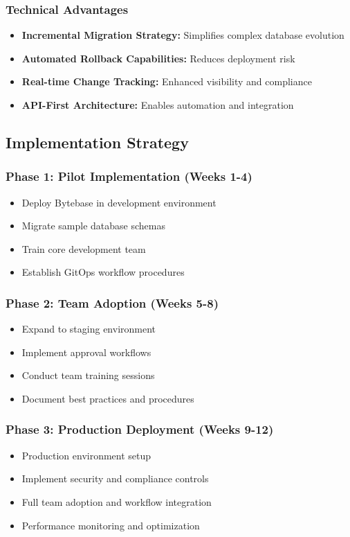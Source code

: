 \subsubsection{Technical Advantages}
\begin{itemize}
    \item \textbf{Incremental Migration Strategy:} Simplifies complex database evolution
    \item \textbf{Automated Rollback Capabilities:} Reduces deployment risk
    \item \textbf{Real-time Change Tracking:} Enhanced visibility and compliance
    \item \textbf{API-First Architecture:} Enables automation and integration
\end{itemize}

\subsection{Implementation Strategy}

\subsubsection{Phase 1: Pilot Implementation (Weeks 1-4)}
\begin{itemize}
    \item Deploy Bytebase in development environment
    \item Migrate sample database schemas
    \item Train core development team
    \item Establish GitOps workflow procedures
\end{itemize}

\subsubsection{Phase 2: Team Adoption (Weeks 5-8)}
\begin{itemize}
    \item Expand to staging environment
    \item Implement approval workflows
    \item Conduct team training sessions
    \item Document best practices and procedures
\end{itemize}

\subsubsection{Phase 3: Production Deployment (Weeks 9-12)}
\begin{itemize}
    \item Production environment setup
    \item Implement security and compliance controls
    \item Full team adoption and workflow integration
    \item Performance monitoring and optimization
\end{itemize}

